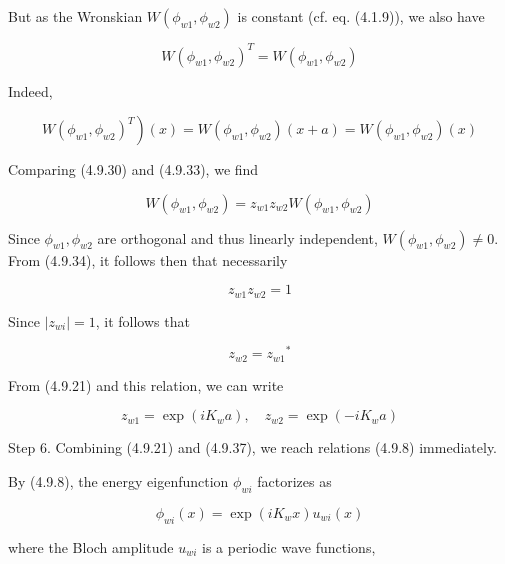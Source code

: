 \documentclass{article}
\begin{document}
But as the Wronskian $W\left(\phi_{w 1}, \phi_{w 2}\right)$ is constant (cf. eq. (4.1.9)), we also have
 
\begin{equation*}
W\left(\phi_{w 1}, \phi_{w 2}\right)^{T}=W\left(\phi_{w 1}, \phi_{w 2}\right) \tag{4.9.32}
\end{equation*}
 

Indeed,
 
\begin{equation*}
\left.W\left(\phi_{w 1}, \phi_{w 2}\right)^{T}\right)(x)=W\left(\phi_{w 1}, \phi_{w 2}\right)(x+a)=W\left(\phi_{w 1}, \phi_{w 2}\right)(x) \tag{4.9.33}
\end{equation*}
 

Comparing (4.9.30) and (4.9.33), we find
 
\begin{equation*}
W\left(\phi_{w 1}, \phi_{w 2}\right)=z_{w 1} z_{w 2} W\left(\phi_{w 1}, \phi_{w 2}\right) \tag{4.9.34}
\end{equation*}
 

Since $\phi_{w 1}, \phi_{w 2}$ are orthogonal and thus linearly independent, $W\left(\phi_{w 1}, \phi_{w 2}\right) \neq 0$. From (4.9.34), it follows then that necessarily
 
\begin{equation*}
z_{w 1} z_{w 2}=1 \tag{4.9.35}
\end{equation*}
 

Since $\left|z_{w i}\right|=1$, it follows that
 
\begin{equation*}
z_{w 2}=z_{w 1}{ }^{*} \tag{4.9.36}
\end{equation*}
 

From (4.9.21) and this relation, we can write
 
\begin{equation*}
z_{w 1}=\exp \left(i K_{w} a\right), \quad z_{w 2}=\exp \left(-i K_{w} a\right) \tag{4.9.37}
\end{equation*}
 

Step 6. Combining (4.9.21) and (4.9.37), we reach relations (4.9.8) immediately.

By (4.9.8), the energy eigenfunction $\phi_{w i}$ factorizes as
 
\begin{equation*}
\phi_{w i}(x)=\exp \left(i K_{w} x\right) u_{w i}(x) \tag{4.9.38}
\end{equation*}
 
where the Bloch amplitude $u_{w i}$ is a periodic wave functions,
 
\end{document}
